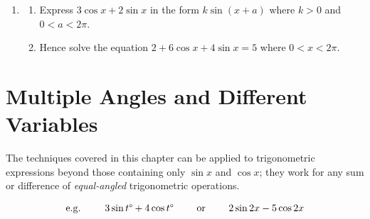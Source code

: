 \documentclass[
  11pt,
  openany]{book}
\begin{document}
\begin{enumerate}
\begin{enumerate}
    \end{enumerate}
    \item 
    \begin{enumerate}
        \item Express $3\cos{x}+2\sin{x}$ in the form $k\sin{(x+a)}$ where $k>0$ and $0<a<2\pi$. \faCalculator
        \item Hence solve the equation $2+6\cos{x}+4\sin{x}=5$ where $0<x<2\pi$. \faCalculator
    \end{enumerate}
\end{enumerate}

\pagebreak

\section{Multiple Angles and Different Variables}\label{multiple-angles-and-different-variables}

\vspace{-0.5cm}

The techniques covered in this chapter can be applied to trigonometric expressions beyond those containing only \(\sin{x}\) and \(\cos{x}\); they work for any sum or difference of \emph{equal-angled} trigonometric operations.

\vspace{-0.2cm}

\[\text{e.g. }\qquad 3\sin{t}\degree+4\cos{t}\degree \qquad \text{ or } \qquad 2\sin{2x}-5\cos{2x}\]
\end{document}
